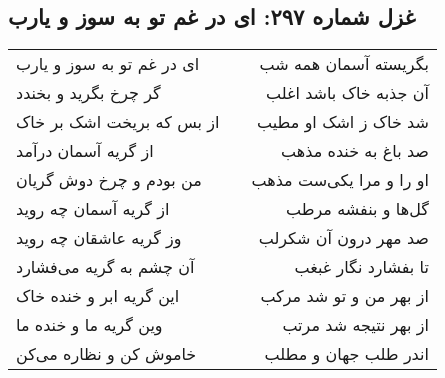 \begin{center}
\section*{غزل شماره ۲۹۷: ای در غم تو به سوز و یارب}
\label{sec:0297}
\begin{longtable}{l p{0.5cm} r}
ای در غم تو به سوز و یارب
&&
بگریسته آسمان همه شب
\\
گر چرخ بگرید و بخندد
&&
آن جذبه خاک باشد اغلب
\\
از بس که بریخت اشک بر خاک
&&
شد خاک ز اشک او مطیب
\\
از گریه آسمان درآمد
&&
صد باغ به خنده مذهب
\\
من بودم و چرخ دوش گریان
&&
او را و مرا یکی‌ست مذهب
\\
از گریه آسمان چه روید
&&
گل‌ها و بنفشه مرطب
\\
وز گریه عاشقان چه روید
&&
صد مهر درون آن شکرلب
\\
آن چشم به گریه می‌فشارد
&&
تا بفشارد نگار غبغب
\\
این گریه ابر و خنده خاک
&&
از بهر من و تو شد مرکب
\\
وین گریه ما و خنده ما
&&
از بهر نتیجه شد مرتب
\\
خاموش کن و نظاره می‌کن
&&
اندر طلب جهان و مطلب
\\
\end{longtable}
\end{center}
